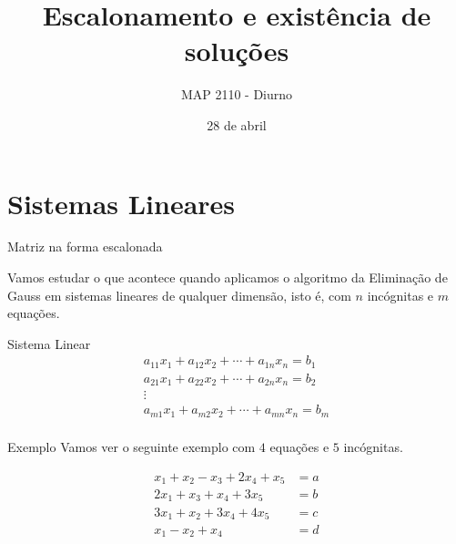 \documentclass{beamer}
\title[Escalonamento]{Escalonamento e existência de soluções}
\author{MAP 2110 - Diurno}
\institute{IME USP}
\date{28 de abril}
\begin{document}
\begin{frame}
  \titlepage
\end{frame}



\section{Sistemas Lineares}

\begin{frame}{Matriz na forma escalonada}

 Vamos estudar o que acontece quando aplicamos o algoritmo da Eliminação de Gauss em sistemas
 lineares de qualquer dimensão, isto é, com $n$ incógnitas e $m$ equações.
   \begin{block}{Sistema Linear}
     \begin{gather*}
      a_{11}x_1 + a_{12}x_2 + \cdots + a_{1n}x_n = b_1 \\
      a_{21}x_1 + a_{22}x_2 + \cdots + a_{2n}x_n = b_2 \\
      \vdots \\
      a_{m1}x_1 + a_{m2}x_2 + \cdots + a_{mn}x_n = b_m \\
    \end{gather*}
  \end{block}
\end{frame}

\begin{frame}{Exemplo}
  Vamos ver o seguinte exemplo com $4$ equações e $5$ incógnitas.

  \begin{align*}
    x_1 + x_2 - x_3 + 2x_4 +x_5 &= a \\
    2x_1 +  x_3 + x_4 +3x_5 &= b \\
    3x_1 + x_2  + 3x_4 +4x_5 &= c \\
    x_1 -x_2 + x_4  &= d\\
  \end{align*}
  
\end{frame}
\end{document}
